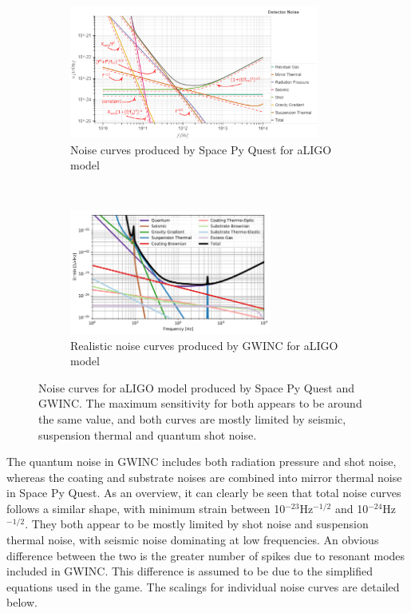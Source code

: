\documentclass{article}
\begin{document}
 \begin{figure}[h!]
     \centering
         \begin{subfigure}{\textwidth}
        \centering
         \includegraphics[width=0.9\textwidth, trim = {0 0 0 0.7cm}, clip]{SPQaLIGOscalings.pdf}
         \caption{Noise curves produced by Space Py Quest for aLIGO model}
         \label{fig::PowerStages}
         \end{subfigure}%
         \\
        \begin{subfigure}{\textwidth}
        \centering
         \includegraphics[width=0.73\textwidth, viewport=50 0 560 310]{gwinc_aLIGO.pdf}
         \caption{Realistic noise curves produced by GWINC for aLIGO model}
         \label{fig::PowerStagesMass}
         \end{subfigure}
         \caption{Noise curves for aLIGO model produced by Space Py
           Quest and GWINC. The maximum sensitivity for both appears
           to be around the same value, and both curves are mostly
           limited by seismic, suspension thermal and quantum shot
           noise.}
         \label{fig::SPQGWINCaLIGO}
 \end{figure}

The quantum noise in GWINC includes both radiation pressure and shot
noise, whereas the coating and substrate noises are combined into
mirror thermal noise in Space Py Quest. As an overview, it can clearly
be seen that total noise curves follows a similar shape, with minimum
strain between 10$^{-23}$Hz$^{-1/2}$ and 10$^{-24}$Hz$^{-1/2}$. They
both appear to be mostly limited by shot noise and suspension thermal
noise, with seismic noise dominating at low frequencies. An obvious
difference between the two is the greater number of spikes due to
resonant modes included in GWINC. This difference is assumed to be due
to the simplified equations used in the game. The scalings for
individual noise curves are detailed below. 
\end{document}
